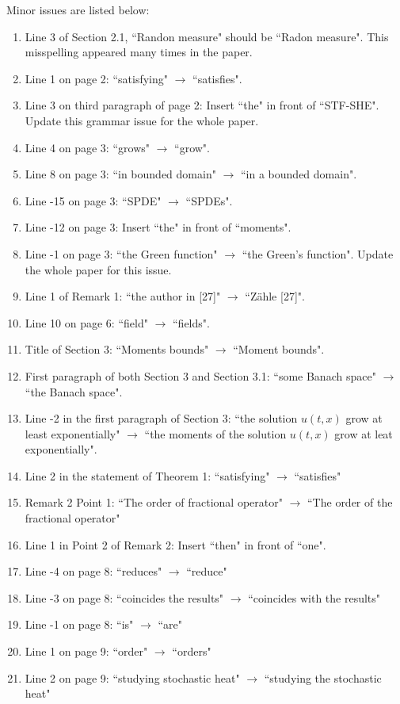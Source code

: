 \documentclass[12pt]{article} %
\begin{document}
Minor issues are listed below:
\begin{enumerate}
	\item Line 3 of Section 2.1, ``Randon measure" should be ``Radon measure".
		This misspelling appeared many times in the paper.
	\item Line 1 on page 2: ``satisfying" $\to$ ``satisfies".
	\item Line 3 on third paragraph of page 2: Insert ``the" in front of
		``STF-SHE". Update this grammar issue for the whole paper.
	\item Line 4 on page 3: ``grows" $\to$ ``grow".
	\item Line 8 on page 3: ``in bounded domain" $\to$ ``in a bounded domain".
	\item Line -15 on page 3: ``SPDE" $\to$ ``SPDEs".
	\item Line -12 on page 3: Insert ``the" in front of ``moments".
	\item Line -1 on page 3: ``the Green function" $\to$ ``the Green's function".
		Update the whole paper for this issue.
	\item Line 1 of Remark 1: ``the author in [27]" $\to$ ``Z\"ahle [27]".
	\item Line 10 on page 6: ``field" $\to$ ``fields".
	\item Title of Section 3:	``Moments bounds" $\to$ ``Moment bounds".
	\item First paragraph of both Section 3 and Section 3.1: ``some Banach space"
		$\to$ ``the Banach space".
	\item Line -2 in the first paragraph of Section 3: ``the solution $u(t,x)$
		grow at least exponentially" $\to$ ``the moments of the solution $u(t,x)$
		grow at leat exponentially".
	\item Line 2 in the statement of Theorem 1: ``satisfying" $\to$ ``satisfies"
	\item Remark 2 Point 1: ``The order of fractional operator" $\to$ ``The order of the
		fractional operator"
	\item Line 1 in Point 2 of Remark 2: Insert ``then" in front of ``one".
	\item Line -4 on page 8: ``reduces" $\to$ ``reduce"
	\item Line -3 on page 8: ``coincides the results" $\to$ ``coincides with the results"
	\item Line -1 on page 8: ``is" $\to$ ``are"
	\item Line 1 on page 9: ``order" $\to$ ``orders"
	\item Line 2 on page 9: ``studying stochastic heat" $\to$ ``studying
		the stochastic heat"
\end{enumerate}
\end{document}
